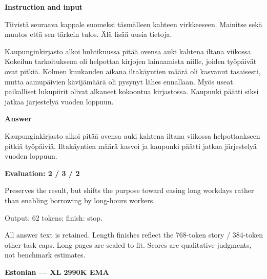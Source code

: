 \documentclass[10pt]{article}
\begin{document}
{\begin{minipage}{\textwidth}
\textbf{Instruction and input}\par Tiivistä seuraava kappale suomeksi täsmälleen kahteen virkkeeseen. Mainitse sekä muutos että sen tärkein tulos. Älä lisää uusia tietoja.
\par\smallskip
Kaupunginkirjasto alkoi huhtikuussa pitää ovensa auki kahtena iltana viikossa. Kokeilun tarkoituksena oli helpottaa kirjojen lainaamista niille, joiden työpäivät ovat pitkiä. Kolmen kuukauden aikana iltakäyntien määrä oli kasvanut tasaisesti, mutta aamupäivien kävijämäärä oli pysynyt lähes ennallaan. Myös useat paikalliset lukupiirit olivat alkaneet kokoontua kirjastossa. Kaupunki päätti siksi jatkaa järjestelyä vuoden loppuun.\par\smallskip
\textbf{Answer}\par Kaupunginkirjasto alkoi pitää ovensa auki kahtena iltana viikossa helpottaakseen pitkiä työpäiviä. Iltakäyntien määrä kasvoi ja kaupunki päätti jatkaa järjestelyä vuoden loppuun.\par\smallskip
\textbf{Evaluation: 2 / 3 / 2}\par Preserves the result, but shifts the purpose toward easing long workdays rather than enabling borrowing by long-hours workers.
\par {\color{gray} Output: 62 tokens; finish: stop.}\par
\medskip\footnotesize All answer text is retained. Length finishes reflect the 768-token story / 384-token other-task caps. Long pages are scaled to fit. Scores are qualitative judgments, not benchmark estimates.
\end{minipage}}%
\noindent\ifdim\dimexpr\ht\languagepage+\dp\languagepage\relax>0.93\textheight%
\resizebox*{!}{0.93\textheight}{\usebox{\languagepage}}%
\else\usebox{\languagepage}\fi%
\clearpage
{\Large\bfseries Estonian --- XL 2990K EMA}\par\smallskip
\end{document}
